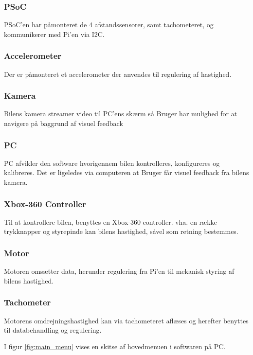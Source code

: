 \subsubsection{PSoC}
PSoC'en har påmonteret de 4 afstandssensorer, samt tachometeret, og kommunikerer med Pi'en via I2C.

\subsubsection{Accelerometer}
Der er påmonteret et accelerometer der anvendes til regulering af hastighed.

\subsubsection{Kamera}
Bilens kamera streamer video til PC'ens skærm så Bruger har mulighed for at navigere på baggrund af visuel feedback

\subsubsection{PC}
PC afvikler den software hvorigennem bilen kontrolleres, konfigureres og kalibreres. Det er ligeledes via computeren at Bruger får visuel feedback fra bilens kamera. 

\subsubsection{Xbox-360 Controller}
Til at kontrollere bilen, benyttes en Xbox-360 controller. vha. en række trykknapper og styrepinde kan bilens hastighed, såvel som retning bestemmes. 

\subsubsection{Motor}
Motoren omsætter data, herunder regulering fra Pi'en til mekanisk styring af bilens hastighed.

\subsubsection{Tachometer}
Motorens omdrejningshastighed kan via tachometeret aflæses og herefter benyttes til databehandling og regulering. 
\clearpage

I figur \ref{fig:main_menu} vises en skitse af hovedmenuen i softwaren på PC. 

